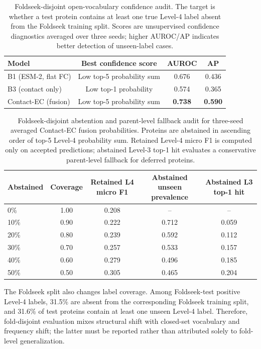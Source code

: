 \documentclass[11pt,a4paper]{article}
\begin{document}
\begin{table}[htbp]
\centering
\caption{Foldseek-disjoint open-vocabulary confidence audit. The target is
whether a test protein contains at least one true Level-4 label absent from the
Foldseek training split. Scores are unsupervised confidence diagnostics averaged
over three seeds; higher AUROC/AP indicates better detection of unseen-label
cases.}
\label{tab:foldseek_open_set_confidence}
\small
\setlength{\tabcolsep}{5pt}
\begin{tabular}{lccc}
\toprule
Model & Best confidence score & AUROC & AP \\
\midrule
B1 (ESM-2, flat FC) & Low top-5 probability sum & 0.676 & 0.436 \\
B3 (contact only) & Low top-1 probability & 0.574 & 0.365 \\
Contact-EC (fusion) & Low top-5 probability sum & \textbf{0.738} & \textbf{0.590} \\
\bottomrule
\end{tabular}
\end{table}

\begin{table}[htbp]
\centering
\caption{Foldseek-disjoint abstention and parent-level fallback audit for
three-seed averaged Contact-EC fusion probabilities. Proteins are abstained in
ascending order of top-5 Level-4 probability sum. Retained Level-4 micro F1 is
computed only on accepted predictions; abstained Level-3 top-1 hit evaluates a
conservative parent-level fallback for deferred proteins.}
\label{tab:foldseek_abstention_fallback}
\small
\setlength{\tabcolsep}{4pt}
\begin{tabular}{lcccc}
\toprule
Abstained & Coverage & Retained L4 micro F1 & Abstained unseen prevalence & Abstained L3 top-1 hit \\
\midrule
0\% & 1.00 & 0.208 & -- & -- \\
10\% & 0.90 & 0.222 & 0.712 & 0.059 \\
20\% & 0.80 & 0.239 & 0.592 & 0.112 \\
30\% & 0.70 & 0.257 & 0.533 & 0.157 \\
40\% & 0.60 & 0.279 & 0.496 & 0.185 \\
50\% & 0.50 & 0.305 & 0.465 & 0.204 \\
\bottomrule
\end{tabular}
\end{table}

The Foldseek split also changes label coverage. Among Foldseek-test positive
Level-4 labels, 31.5\% are absent from the corresponding Foldseek training split,
and 31.6\% of test proteins contain at least one unseen Level-4 label. Therefore,
fold-disjoint evaluation mixes structural shift with closed-set vocabulary and
frequency shift; the latter must be reported rather than attributed solely to
fold-level generalization.
\end{document}
